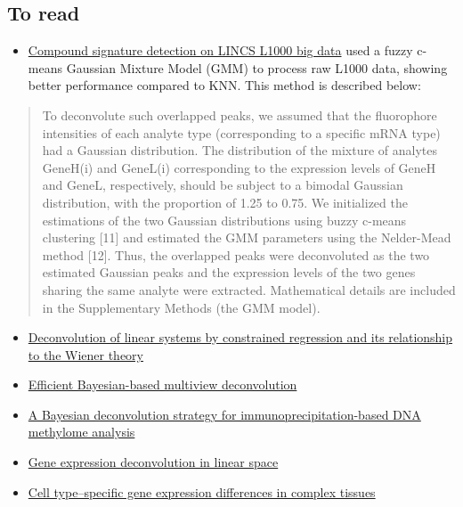 \documentclass[]{article}
\providecommand{\tightlist}{%
  \setlength{\itemsep}{0pt}\setlength{\parskip}{0pt}}
\begin{document}
\hypertarget{to-read-1}{%
\subsection{To read}\label{to-read-1}}

\begin{itemize}
\tightlist
\item
  \href{https://pubs.rsc.org/en/content/getauthorversionpdf/c4mb00677a}{Compound
  signature detection on LINCS L1000 big data} used a fuzzy c-means
  Gaussian Mixture Model (GMM) to process raw L1000 data, showing better
  performance compared to KNN. This method is described below:
\end{itemize}

\begin{quote}
To deconvolute such overlapped peaks, we assumed that the fluorophore
intensities of each analyte type (corresponding to a specific mRNA type)
had a Gaussian distribution. The distribution of the mixture of analytes
GeneH(i) and GeneL(i) corresponding to the expression levels of GeneH
and GeneL, respectively, should be subject to a bimodal Gaussian
distribution, with the proportion of 1.25 to 0.75. We initialized the
estimations of the two Gaussian distributions using buzzy c-means
clustering {[}11{]} and estimated the GMM parameters using the
Nelder-Mead method {[}12{]}. Thus, the overlapped peaks were
deconvoluted as the two estimated Gaussian peaks and the expression
levels of the two genes sharing the same analyte were extracted.
Mathematical details are included in the Supplementary Methods (the GMM
model).
\end{quote}

\begin{itemize}
\item
  \href{https://ieeexplore.ieee.org/abstract/document/4044778}{Deconvolution
  of linear systems by constrained regression and its relationship to
  the Wiener theory}
\item
  \href{https://www.nature.com/articles/nmeth.2929}{Efficient
  Bayesian-based multiview deconvolution}
\item
  \href{https://www.nature.com/articles/nbt1414}{A Bayesian
  deconvolution strategy for immunoprecipitation-based DNA methylome
  analysis}
\item
  \href{https://www.nature.com/articles/nmeth.1830}{Gene expression
  deconvolution in linear space}
\item
  \href{https://www.nature.com/articles/nmeth.1439}{Cell type--specific
  gene expression differences in complex tissues}
\end{itemize}
\end{document}

